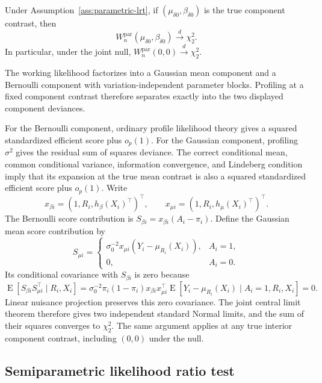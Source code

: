 \documentclass[11pt]{article}
\DeclareMathOperator{\E}{E}
\begin{document}
\begin{mainproposition}\label{prop:parametric-lrt}
Under Assumption~\ref{ass:parametric-lrt}, if $(\mu_{\delta0},\beta_{\delta0})$ is the true component contrast, then
\[
  W_n^{\mathrm{par}}(\mu_{\delta0},\beta_{\delta0})
  \overset{d}{\longrightarrow}\chi^2_2.
\]
In particular, under the joint null, $W_n^{\mathrm{par}}(0,0)\overset{d}{\longrightarrow}\chi^2_2$.
\end{mainproposition}

\begin{mainproof}
The working likelihood factorizes into a Gaussian mean component and a Bernoulli component with variation-independent parameter blocks. Profiling at a fixed component contrast therefore separates exactly into the two displayed component deviances.

For the Bernoulli component, ordinary profile likelihood theory gives a squared standardized efficient score plus $o_p(1)$. For the Gaussian component, profiling $\sigma^2$ gives the residual sum of squares deviance. The correct conditional mean, common conditional variance, information convergence, and Lindeberg condition imply that its expansion at the true mean contrast is also a squared standardized efficient score plus $o_p(1)$. Write
\[
  x_{\beta i}=(1,R_i,h_\beta(X_i)^\top)^\top,
  \qquad
  x_{\mu i}=(1,R_i,h_\mu(X_i)^\top)^\top.
\]
The Bernoulli score contribution is $S_{\beta i}=x_{\beta i}(A_i-\pi_i)$. Define the Gaussian mean score contribution by
\[
  S_{\mu i}
  =
  \begin{cases}
    \sigma_0^{-2}x_{\mu i}(Y_i-\mu_{R_i}(X_i)), & A_i=1,\\
    0, & A_i=0.
  \end{cases}
\]
Its conditional covariance with $S_{\beta i}$ is zero because
\[
  \E[S_{\beta i}S_{\mu i}^\top\mid R_i,X_i]
  =
  \sigma_0^{-2}\pi_i(1-\pi_i)x_{\beta i}x_{\mu i}^\top
  \E[Y_i-\mu_{R_i}(X_i)\mid A_i=1,R_i,X_i]
  =0.
\]
Linear nuisance projection preserves this zero covariance. The joint central limit theorem therefore gives two independent standard Normal limits, and the sum of their squares converges to $\chi^2_2$. The same argument applies at any true interior component contrast, including $(0,0)$ under the null.
\end{mainproof}


\subsection{Semiparametric likelihood ratio test}
\end{document}

